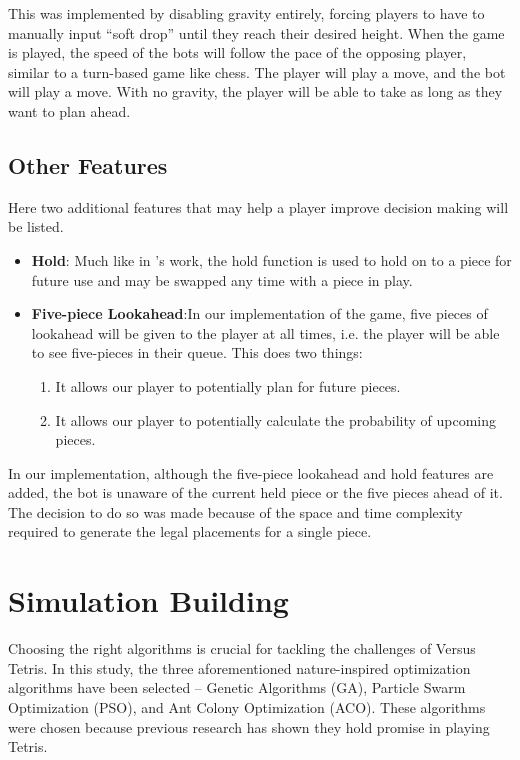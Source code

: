 \documentclass[a4paper, 12pt]{extreport}
\begin{document}
	This was implemented by disabling gravity entirely, forcing players to have to manually input ``soft drop'' until they reach their desired height. When the game is played, the speed of the bots will follow the pace of the opposing player, similar to a turn-based game like chess. The player will play a move, and the bot will play a move. With no gravity, the player will be able to take as long as they want to plan ahead.
	
	\subsection{Other Features}
	
	Here two additional features that may help a player improve decision making will be listed.
	
	\begin{itemize}
		\item \textbf{Hold}: Much like in \citeauthor{tetris-drl-2}'s \cite{tetris-drl-2} work, the hold function is used to hold on to a piece for future use and may be swapped any time with a piece in play.
		\item \textbf{Five-piece Lookahead}:In our implementation of the game, five pieces of lookahead will be given to the player at all times, i.e. the player will be able to see five-pieces in their queue. This does two things:
		\begin{enumerate}
			\item It allows our player to potentially plan for future pieces.
			\item It allows our player to potentially calculate the probability of upcoming pieces.
		\end{enumerate}
	\end{itemize}
	In our implementation, although the five-piece lookahead and hold features are added, the bot is unaware of the current held piece or the five pieces ahead of it. The decision to do so was made because of the space and time complexity required to generate the legal placements for a single piece.
	
	\section{Simulation Building}\label{sec:sim-building}
	Choosing the right algorithms is crucial for tackling the challenges of Versus Tetris. In this study, the three aforementioned nature-inspired optimization algorithms have been selected -- Genetic Algorithms (GA), Particle Swarm Optimization (PSO), and Ant Colony Optimization (ACO). These algorithms were chosen because previous research has shown they hold promise in playing Tetris.
	
\end{document}
